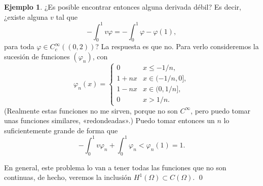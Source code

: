 \documentclass[12pt,a4paper]{book}
\theoremstyle{definition} \newtheorem{defn}[thm]{Definición}
\theoremstyle{definition} \newtheorem{ejemplo}[thm]{Ejemplo}
\theoremstyle{definition} \newtheorem{ejercicio}[thm]{Ejercicio}
\theoremstyle{remark} \newtheorem*{obs}{Observación}
\begin{document}
\begin{ejemplo}
    ¿Es posible encontrar entonces alguna derivada débil? Es decir, ¿existe alguna $v$ tal que 
    \begin{equation*}
      -\int_0^1 v \varphi = -\int_0^1 \varphi - \varphi(1),
    \end{equation*}
    para toda $\varphi \in C^{\infty}_c( (0,2))$?
    La respuesta es que no. Para verlo consideremos la sucesión de funciones $(\varphi_n)$, con 
    \begin{equation*}
      \varphi_n (x)=
      \begin{cases}
	0 & x \leq -1/n, \\
      1+nx & x \in (-1/n,0], \\
    1-nx & x \in (0,1/n], \\
    0 & x > 1/n.
      \end{cases}
    \end{equation*}
    (Realmente estas funciones no me sirven, porque no son $C^\infty$, pero puedo tomar unas funciones similares, «redondeadas».) Puedo tomar entonces un $n$ lo suficientemente grande de forma que
    \begin{equation*}
      -\int_0^1 v \varphi_n + \int_0^1 \varphi_n < \varphi_n(1)=1.
    \end{equation*}

    En general, este problema lo van a tener todas las funciones que no son continuas, de hecho, veremos la inclusión $H^1(\Omega) \subset C(\Omega)$. \qed
  \end{ejemplo}
\end{document}
